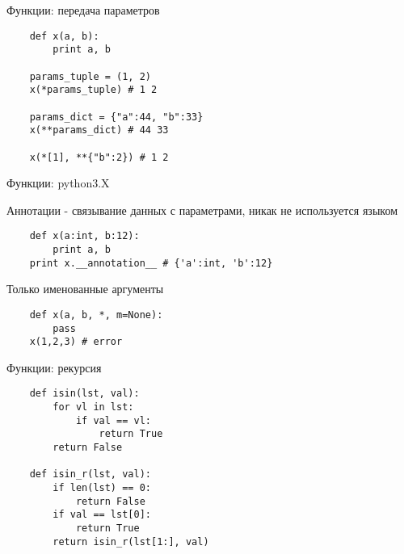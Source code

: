 \documentclass{article}
\begin{document}
\begin{center} Функции: передача параметров \end{center}
\vspace{15pt}
\begin{lstlisting}
    def x(a, b):
        print a, b

    params_tuple = (1, 2)
    x(*params_tuple) # 1 2

    params_dict = {"a":44, "b":33}
    x(**params_dict) # 44 33

    x(*[1], **{"b":2}) # 1 2
\end{lstlisting}
\newpage

\begin{center} Функции: python3.X \end{center}
\vspace{15pt}
Аннотации - связывание данных с параметрами, никак не используется языком
\begin{lstlisting}
    def x(a:int, b:12):
        print a, b
    print x.__annotation__ # {'a':int, 'b':12}
\end{lstlisting}
Только именованные аргументы
\begin{lstlisting}
    def x(a, b, *, m=None):
        pass
    x(1,2,3) # error
\end{lstlisting}
\newpage

\begin{center} Функции: рекурсия \end{center}
\vspace{15pt}
\begin{lstlisting}
    def isin(lst, val):
        for vl in lst:
            if val == vl:
                return True
        return False

    def isin_r(lst, val):
        if len(lst) == 0:
            return False
        if val == lst[0]:
            return True
        return isin_r(lst[1:], val)
\end{lstlisting}
\newpage

\end{document}
